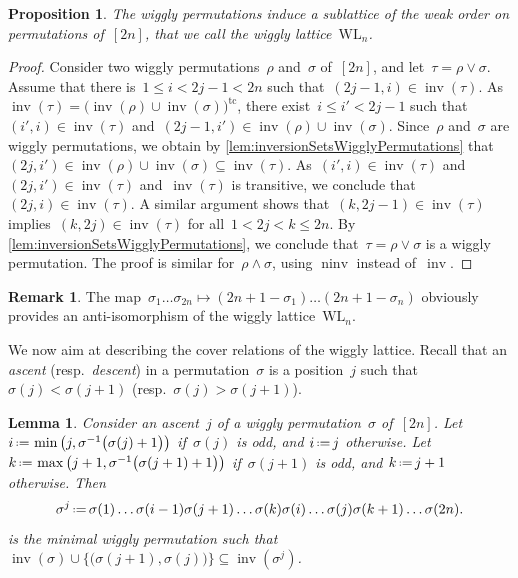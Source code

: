 \documentclass{amsart}
\newtheorem{proposition}[theorem]{Proposition}
\newtheorem{lemma}[theorem]{Lemma}
\theoremstyle{definition}
\newtheorem{remark}[theorem]{Remark}
\newcommand{\eqdef}{\mbox{\,\raisebox{0.2ex}{\scriptsize\ensuremath{\mathrm:}}\ensuremath{=}\,}} %
\DeclareMathOperator{\inv}{inv} %
\DeclareMathOperator{\ninv}{ninv} %
\newcommand{\darkblue}{\color{darkblue}} %
\newcommand{\defn}[1]{\textsl{\darkblue #1}} %
\newcommand{\meet}{\wedge} %
\newcommand{\join}{\vee} %
\newcommand{\wigglyLattice}{\mathrm{WL}} %
\begin{document}
\begin{proposition}
The wiggly permutations induce a sublattice of the weak order on permutations of~$[2n]$, that we call the \defn{wiggly lattice}~$\wigglyLattice_n$.
\end{proposition}

\begin{proof}
Consider two wiggly permutations~$\rho$ and~$\sigma$ of~$[2n]$, and let~$\tau = \rho \join \sigma$.
Assume that there is~$1 \le i < 2j-1 < 2n$ such that~$(2j-1, i) \in \inv(\tau)$.
As $\inv(\tau) = \big( \inv(\rho) \cup \inv(\sigma) \big)^\textrm{tc}$, there exist~$i \le i' < 2j-1$ such that~$(i', i) \in \inv(\tau)$ and~$(2j-1, i') \in \inv(\rho) \cup \inv(\sigma)$.
Since~$\rho$ and~$\sigma$ are wiggly permutations, we obtain by \cref{lem:inversionSetsWigglyPermutations} that~$(2j, i') \in \inv(\rho) \cup \inv(\sigma) \subseteq \inv(\tau)$.
As~$(i', i) \in \inv(\tau)$ and~$(2j, i') \in \inv(\tau)$ and~$\inv(\tau)$ is transitive, we conclude that~$(2j,i) \in \inv(\tau)$.
A similar argument shows that~$(k, 2j-1) \in \inv(\tau)$ implies~$(k, 2j) \in \inv(\tau)$ for all~$1 < 2j < k \le 2n$.
By \cref{lem:inversionSetsWigglyPermutations}, we conclude that~$\tau = \rho \join \sigma$ is a wiggly permutation.
The proof is similar for~$\rho \meet \sigma$, using $\ninv$ instead of~$\inv$.
\end{proof}

\begin{remark}
\label{rem:wigglyLatticeAntiIsomorphism}
The map~$\sigma_1 \dots \sigma_{2n} \mapsto (2n+1-\sigma_1) \dots (2n+1-\sigma_n)$ obviously provides an anti-isomorphism of the wiggly lattice~$\wigglyLattice_n$.
\end{remark}

We now aim at describing the cover relations of the wiggly lattice.
Recall that an \defn{ascent} (resp.~\defn{descent}) in a permutation~$\sigma$ is a position~$j$ such that~$\sigma(j) < \sigma(j+1)$ (resp.~$\sigma(j) > \sigma(j+1)$).

\begin{lemma}\label{lem:wigglyCoverRelation}
Consider an ascent~$j$ of a wiggly permutation~$\sigma$ of~$[2n]$.
Let~$i \eqdef \min \big( j, \sigma^{-1} \big( \sigma(j)+1 \big) \big)$ if~$\sigma(j)$ is odd, and $i \eqdef j$ otherwise.
Let~$k \eqdef \max \big( j+1, \sigma^{-1} \big( \sigma(j+1)+1 \big) \big)$ if~$\sigma(j+1)$ is odd, and $k \eqdef j+1$ otherwise.
Then
\[
\sigma^j \eqdef \sigma(1) \dots \sigma(i-1) \sigma(j+1) \dots \sigma(k) \sigma(i) \dots \sigma(j) \sigma(k+1) \dots \sigma(2n).
\]
is the minimal wiggly permutation such that~$\inv(\sigma) \cup \big\{ \big( \sigma(j+1), \sigma(j) \big) \big\} \subseteq \inv(\sigma^j)$.
\end{lemma}
\end{document}
